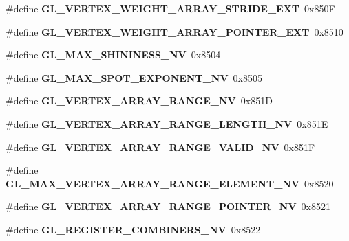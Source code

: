 \begin{DoxyCompactItemize}
\item 
\#define {\bfseries G\+L\+\_\+\+V\+E\+R\+T\+E\+X\+\_\+\+W\+E\+I\+G\+H\+T\+\_\+\+A\+R\+R\+A\+Y\+\_\+\+S\+T\+R\+I\+D\+E\+\_\+\+E\+X\+T}~0x850\+F\label{_s_d_l__opengl_8h_a8e6e4e896fab760a5ca189ab7cb57a3a}

\item 
\#define {\bfseries G\+L\+\_\+\+V\+E\+R\+T\+E\+X\+\_\+\+W\+E\+I\+G\+H\+T\+\_\+\+A\+R\+R\+A\+Y\+\_\+\+P\+O\+I\+N\+T\+E\+R\+\_\+\+E\+X\+T}~0x8510\label{_s_d_l__opengl_8h_a982241a9bdad1a35fe564f8facce923e}

\item 
\#define {\bfseries G\+L\+\_\+\+M\+A\+X\+\_\+\+S\+H\+I\+N\+I\+N\+E\+S\+S\+\_\+\+N\+V}~0x8504\label{_s_d_l__opengl_8h_a4edd502e0f153e799da5db454f6f12cd}

\item 
\#define {\bfseries G\+L\+\_\+\+M\+A\+X\+\_\+\+S\+P\+O\+T\+\_\+\+E\+X\+P\+O\+N\+E\+N\+T\+\_\+\+N\+V}~0x8505\label{_s_d_l__opengl_8h_a6507ce80d640aaac79cb2553697ce968}

\item 
\#define {\bfseries G\+L\+\_\+\+V\+E\+R\+T\+E\+X\+\_\+\+A\+R\+R\+A\+Y\+\_\+\+R\+A\+N\+G\+E\+\_\+\+N\+V}~0x851\+D\label{_s_d_l__opengl_8h_a102fc5a5c74942cad3681df6cffc01ca}

\item 
\#define {\bfseries G\+L\+\_\+\+V\+E\+R\+T\+E\+X\+\_\+\+A\+R\+R\+A\+Y\+\_\+\+R\+A\+N\+G\+E\+\_\+\+L\+E\+N\+G\+T\+H\+\_\+\+N\+V}~0x851\+E\label{_s_d_l__opengl_8h_ac210b6b71c50ef8f5c79880d1ec28ee9}

\item 
\#define {\bfseries G\+L\+\_\+\+V\+E\+R\+T\+E\+X\+\_\+\+A\+R\+R\+A\+Y\+\_\+\+R\+A\+N\+G\+E\+\_\+\+V\+A\+L\+I\+D\+\_\+\+N\+V}~0x851\+F\label{_s_d_l__opengl_8h_acc9f0bad7dbb4e72c14dd63196c756f9}

\item 
\#define {\bfseries G\+L\+\_\+\+M\+A\+X\+\_\+\+V\+E\+R\+T\+E\+X\+\_\+\+A\+R\+R\+A\+Y\+\_\+\+R\+A\+N\+G\+E\+\_\+\+E\+L\+E\+M\+E\+N\+T\+\_\+\+N\+V}~0x8520\label{_s_d_l__opengl_8h_ae2552e0558b8c06d5aa10cda68945f13}

\item 
\#define {\bfseries G\+L\+\_\+\+V\+E\+R\+T\+E\+X\+\_\+\+A\+R\+R\+A\+Y\+\_\+\+R\+A\+N\+G\+E\+\_\+\+P\+O\+I\+N\+T\+E\+R\+\_\+\+N\+V}~0x8521\label{_s_d_l__opengl_8h_a780ba6dfb986c8b7b77b4d34138f3fe2}

\item 
\#define {\bfseries G\+L\+\_\+\+R\+E\+G\+I\+S\+T\+E\+R\+\_\+\+C\+O\+M\+B\+I\+N\+E\+R\+S\+\_\+\+N\+V}~0x8522\label{_s_d_l__opengl_8h_a6b0ab5ec0f5327b8629657906908e3d5}


\end{DoxyCompactItemize}
